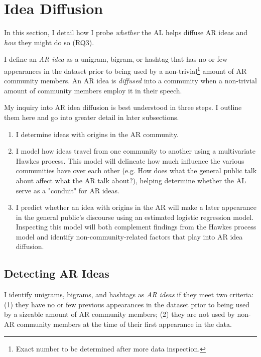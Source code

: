 \documentclass[acmlarge, screen, authorversion]{acmart}
\begin{document}
\section{Idea Diffusion}

In this section, I detail how I probe \textit{whether} the AL helps diffuse AR
ideas and \textit{how} they might do so (RQ3).

I define an \textit{AR idea} as a unigram, bigram, or hashtag that has no or few
appearances in the dataset prior to being used by a non-trivial\footnote{Exact
number to be determined after more data inspection.} amount of AR community
members. An AR idea is \textit{diffused} into a community when a non-trivial
amount of community members employ it in their speech.

My inquiry into AR idea diffusion is best understood in three steps. I outline
them here and go into greater detail in later subsections.

\begin{enumerate} 	\item I determine ideas with origins in the AR community.
	\item I model how ideas travel from one community to another using a
multivariate Hawkes process. This model will delineate how much influence the
various communities have over each other (e.g. How does what the general public
talk about affect what the AR talk about?), helping determine whether the AL
serve as a "conduit" for AR ideas. 	\item I predict whether an idea with origins
in the AR will make a later appearance in the general public's discourse using
an estimated logistic regression model. Inspecting this model will both
complement findings from the Hawkes process model and identify
non-community-related factors that play into AR idea diffusion. \end{enumerate}

\subsection{Detecting AR Ideas}


I identify unigrams, bigrams, and hashtags as \textit{AR ideas} if they meet two
criteria: (1) they have no or few previous appearances in the dataset prior to
being used by a sizeable amount of AR community members; (2) they are not used
by non-AR community members at the time of their first appearance in the data.
\end{document}
